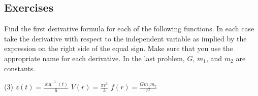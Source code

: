 \documentclass[12pt,]{book}
\theoremstyle{plain}
\theoremstyle{definition}
\numberwithin{equation}{section}
\newcommand{\fe}[2]{#1\mathopen{}\left(#2\right)\mathclose{}}
\begin{document}
\subsection[Exercises]{Exercises}\label{exercises-35}
Find the first derivative formula for each of the following functions.  In each case take the derivative with respect to the independent variable as implied by the expression on the right side of the equal sign.  Make sure that you use the appropriate name for each derivative. In the last problem, \(G\), \(m_1\), and \(m_2\) are constants.%
\par
\begin{exercisegroup}(3)
\exercise[1.]\hypertarget{exercise-363}{\null}\(\fe{z}{t}=\frac{\fe{\sin^{-1}}{t}}{6}\)%
\exercise[2.]\hypertarget{exercise-364}{\null}\(\fe{V}{r}=\frac{\pi r^3}{3}\)%
\exercise[3.]\hypertarget{exercise-365}{\null}\(\fe{f}{r}=\frac{Gm_1m_2}{r^2}\)%
\end{exercisegroup}
\par\smallskip\noindent
\typeout{************************************************}
\typeout{************************************************}
\end{document}
